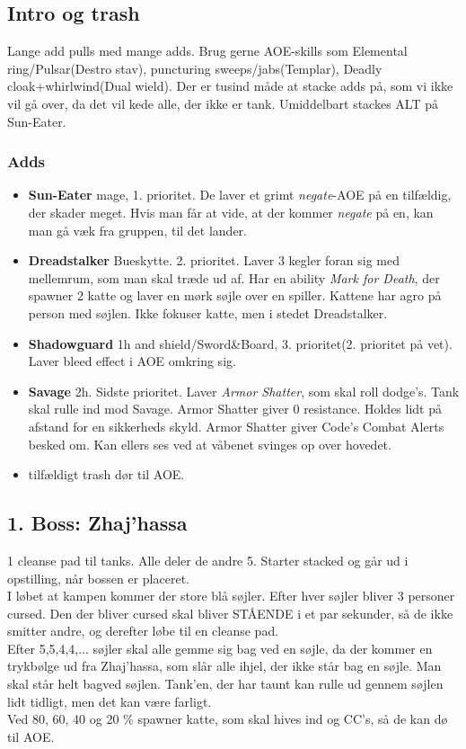 \subsection*{Intro og trash}
Lange add pulls med mange adds. Brug gerne AOE-skills som Elemental ring/Pulsar(Destro
stav), puncturing sweeps/jabs(Templar), Deadly cloak+whirlwind(Dual wield).
Der er tusind måde at stacke adds på, som vi ikke vil gå over, da det vil kede
alle, der ikke er tank. Umiddelbart stackes ALT på Sun-Eater.
\subsubsection*{Adds}
\begin{itemize}
\item \textbf{Sun-Eater} mage, 1. prioritet. De laver et grimt
  \emph{negate}-AOE på en tilfældig, der skader meget. Hvis man får at vide, at
  der kommer \emph{negate} på en, kan man gå væk fra gruppen, til det lander.
\item \textbf{Dreadstalker} Bueskytte. 2. prioritet. Laver 3 kegler
  foran sig med mellemrum, som man skal træde ud af. Har en ability
  \emph{Mark for Death}, der spawner 2 katte og laver en mørk søjle over en
  spiller. Kattene har agro på person med søjlen. Ikke fokuser katte, men i
  stedet Dreadstalker.
\item \textbf{Shadowguard} 1h and shield/Sword\&Board, 3.
  prioritet(2. prioritet på vet). Laver bleed effect i AOE omkring sig.
\item \textbf{Savage} 2h. Sidste prioritet. Laver \emph{Armor
  Shatter}, som skal roll dodge's. Tank skal rulle ind mod Savage. Armor
  Shatter giver 0 resistance. Holdes lidt
  på afstand for en sikkerheds skyld. Armor Shatter giver Code's Combat Alerts
  besked om. Kan ellers ses ved at våbenet svinges op over hovedet.
\item tilfældigt trash dør til AOE. 
\end{itemize}
\subsection*{1. Boss: Zhaj'hassa}
1 cleanse pad til tanks. Alle deler de andre 5. 
Starter stacked og går ud i opstilling, når bossen er placeret.\\ 
I løbet at kampen kommer der store blå søjler. Efter hver søjler bliver 3
personer cursed. Den der bliver cursed skal bliver STÅENDE i et par sekunder,
så de ikke smitter andre, og derefter løbe til en cleanse pad. \\
Efter 5,5,4,4,... søjler skal alle gemme sig bag ved en søjle, da der kommer en
trykbølge ud fra Zhaj'hassa, som slår alle ihjel, der ikke står bag en søjle.
Man skal står helt bagved søjlen. Tank'en, der har taunt kan rulle ud gennem
søjlen lidt tidligt, men det kan være farligt. \\
Ved 80, 60, 40 og 20 \% spawner katte, som skal hives ind og CC's, så de kan dø
til AOE.

